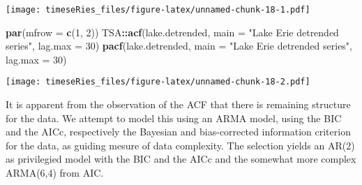 \documentclass[]{book}
\newenvironment{Shaded}{\begin{snugshade}}{\end{snugshade}}
\newcommand{\CommentTok}[1]{\textcolor[rgb]{0.56,0.35,0.01}{\textit{#1}}}
\newcommand{\DataTypeTok}[1]{\textcolor[rgb]{0.13,0.29,0.53}{#1}}
\newcommand{\DecValTok}[1]{\textcolor[rgb]{0.00,0.00,0.81}{#1}}
\newcommand{\KeywordTok}[1]{\textcolor[rgb]{0.13,0.29,0.53}{\textbf{#1}}}
\newcommand{\NormalTok}[1]{#1}
\newcommand{\OperatorTok}[1]{\textcolor[rgb]{0.81,0.36,0.00}{\textbf{#1}}}
\newcommand{\StringTok}[1]{\textcolor[rgb]{0.31,0.60,0.02}{#1}}
\begin{document}
\begin{Shaded}
\end{Shaded}

\texttt{[image: timeseRies\_files/figure-latex/unnamed-chunk-18-1.pdf]}

\begin{Shaded}
\begin{Highlighting}[]
\KeywordTok{par}\NormalTok{(}\DataTypeTok{mfrow =} \KeywordTok{c}\NormalTok{(}\DecValTok{1}\NormalTok{, }\DecValTok{2}\NormalTok{))}
\NormalTok{TSA}\OperatorTok{::}\KeywordTok{acf}\NormalTok{(lake.detrended, }\DataTypeTok{main =} \StringTok{"Lake Erie detrended series"}\NormalTok{, }\DataTypeTok{lag.max =} \DecValTok{30}\NormalTok{)}
\KeywordTok{pacf}\NormalTok{(lake.detrended, }\DataTypeTok{main =} \StringTok{"Lake Erie detrended series"}\NormalTok{, }\DataTypeTok{lag.max =} \DecValTok{30}\NormalTok{)}
\end{Highlighting}
\end{Shaded}

\texttt{[image: timeseRies\_files/figure-latex/unnamed-chunk-18-2.pdf]}

It is apparent from the observation of the ACF that there is remaining
structure for the data. We attempt to model this using an ARMA model,
using the BIC and the AICc, respectively the Bayesian and bias-corrected
information criterion for the data, as guiding mesure of data
complexity. The selection yields an AR(2) as privilegied model with the
BIC and the AICc and the somewhat more complex ARMA(6,4) from AIC.
\end{document}
